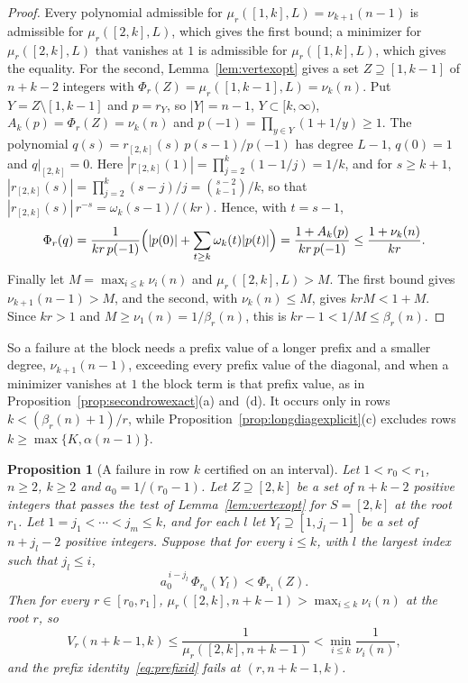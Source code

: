 \documentclass[11pt]{article}
\newtheorem{proposition}[theorem]{Proposition}
\begin{document}
\begin{proof}
Every polynomial admissible for $\mu_r([1,k],L)=\nu_{k+1}(n-1)$ is
admissible for $\mu_r([2,k],L)$, which gives the first bound; a minimizer
for $\mu_r([2,k],L)$ that vanishes at $1$ is admissible for
$\mu_r([1,k],L)$, which gives the equality.  For the second,
Lemma~\ref{lem:vertexopt} gives a set $Z\supseteq[1,k-1]$ of $n+k-2$
integers with $\Phi_r(Z)=\mu_r([1,k-1],L)=\nu_k(n)$.  Put
$Y=Z\setminus[1,k-1]$ and $p=r_Y$, so $|Y|=n-1$, $Y\subset[k,\infty)$,
$A_k(p)=\Phi_r(Z)=\nu_k(n)$ and $p(-1)=\prod_{y\in Y}(1+1/y)\ge1$.  The
polynomial $q(s)=r_{[2,k]}(s)\,p(s-1)/p(-1)$ has degree $L-1$, $q(0)=1$
and $q|_{[2,k]}=0$.  Here $|r_{[2,k]}(1)|=\prod_{j=2}^k(1-1/j)=1/k$, and
for $s\ge k+1$, $|r_{[2,k]}(s)|=\prod_{j=2}^k(s-j)/j=\binom{s-2}{k-1}/k$,
so that $|r_{[2,k]}(s)|\,r^{-s}=\omega_k(s-1)/(kr)$.  Hence, with $t=s-1$,
\[
  \Phi_r(q)=\frac1{kr\,p(-1)}\Bigl(|p(0)|+\sum_{t\ge k}\omega_k(t)|p(t)|\Bigr)
  =\frac{1+A_k(p)}{kr\,p(-1)}\le\frac{1+\nu_k(n)}{kr}.
\]
Finally let $M=\max_{i\le k}\nu_i(n)$ and $\mu_r([2,k],L)>M$.  The first
bound gives $\nu_{k+1}(n-1)>M$, and the second, with $\nu_k(n)\le M$, gives
$krM<1+M$.  Since $kr>1$ and $M\ge\nu_1(n)=1/\beta_r(n)$, this is
$kr-1<1/M\le\beta_r(n)$.
\end{proof}

So a failure at the block needs a prefix value of a longer prefix and a
smaller degree, $\nu_{k+1}(n-1)$, exceeding every prefix value of the
diagonal, and when a minimizer vanishes at $1$ the block term is that prefix
value, as in Proposition~\ref{prop:secondrowexact}(a) and~(d).  It occurs
only in rows $k<(\beta_r(n)+1)/r$, while
Proposition~\ref{prop:longdiagexplicit}(c) excludes rows
$k\ge\max\{K,\alpha(n-1)\}$.

\begin{proposition}[A failure in row $k$ certified on an interval]\label{prop:blockinterval}
Let $1<r_0<r_1$, $n\ge2$, $k\ge2$ and $a_0=1/(r_0-1)$.  Let
$Z\supseteq[2,k]$ be a set of $n+k-2$ positive integers that passes the
test of Lemma~\ref{lem:vertexopt} for $S=[2,k]$ at the root $r_1$.  Let
$1=j_1<\cdots<j_m\le k$, and for each $l$ let $Y_l\supseteq[1,j_l-1]$ be a
set of $n+j_l-2$ positive integers.  Suppose that for every $i\le k$, with
$l$ the largest index such that $j_l\le i$,
\[
  a_0^{\,i-j_l}\,\Phi_{r_0}(Y_l)<\Phi_{r_1}(Z).
\]
Then for every $r\in[r_0,r_1]$, $\mu_r([2,k],n+k-1)>\max_{i\le k}\nu_i(n)$
at the root $r$, so
\[
  V_r(n+k-1,k)\le\frac1{\mu_r([2,k],n+k-1)}<\min_{i\le k}\frac1{\nu_i(n)},
\]
and the prefix identity~\eqref{eq:prefixid} fails at $(r,n+k-1,k)$.
\end{proposition}
\end{document}
